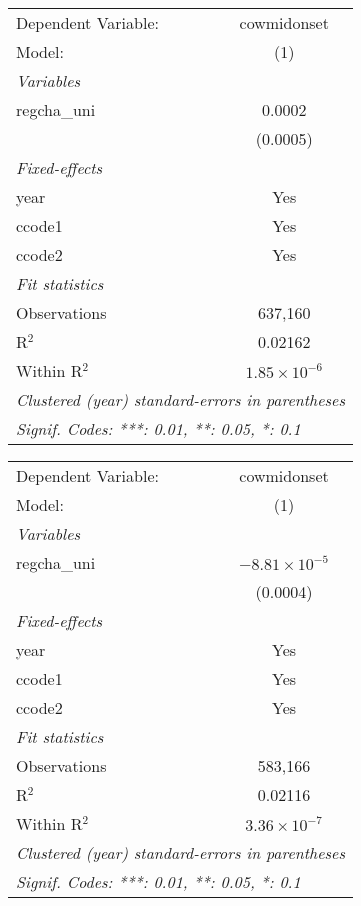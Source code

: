 \begingroup
\centering
\begin{tabular}{lc}
   \tabularnewline \midrule \midrule
   Dependent Variable: & cowmidonset\\  
   Model:              & (1)\\  
   \midrule
   \emph{Variables}\\
   regcha\_uni         & 0.0002\\   
                       & (0.0005)\\   
   \midrule
   \emph{Fixed-effects}\\
   year                & Yes\\  
   ccode1              & Yes\\  
   ccode2              & Yes\\  
   \midrule
   \emph{Fit statistics}\\
   Observations        & 637,160\\  
   R$^2$               & 0.02162\\  
   Within R$^2$        & $1.85\times 10^{-6}$\\   
   \midrule \midrule
   \multicolumn{2}{l}{\emph{Clustered (year) standard-errors in parentheses}}\\
   \multicolumn{2}{l}{\emph{Signif. Codes: ***: 0.01, **: 0.05, *: 0.1}}\\
\end{tabular}
\par\endgroup



\begingroup
\centering
\begin{tabular}{lc}
   \tabularnewline \midrule \midrule
   Dependent Variable: & cowmidonset\\  
   Model:              & (1)\\  
   \midrule
   \emph{Variables}\\
   regcha\_uni         & $-8.81\times 10^{-5}$\\    
                       & (0.0004)\\   
   \midrule
   \emph{Fixed-effects}\\
   year                & Yes\\  
   ccode1              & Yes\\  
   ccode2              & Yes\\  
   \midrule
   \emph{Fit statistics}\\
   Observations        & 583,166\\  
   R$^2$               & 0.02116\\  
   Within R$^2$        & $3.36\times 10^{-7}$\\   
   \midrule \midrule
   \multicolumn{2}{l}{\emph{Clustered (year) standard-errors in parentheses}}\\
   \multicolumn{2}{l}{\emph{Signif. Codes: ***: 0.01, **: 0.05, *: 0.1}}\\
\end{tabular}
\par\endgroup



